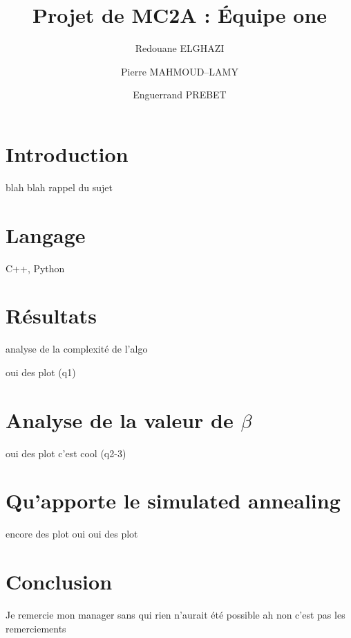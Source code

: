 \documentclass[twocolumn]{report}
\date{}
\author{Redouane ELGHAZI \and Pierre MAHMOUD--LAMY \and Enguerrand PREBET}
\title{Projet de MC2A : Équipe one}
\begin{document}
	\maketitle
	\section{Introduction}
		blah blah rappel du sujet
	\section{Langage}
		C++, Python
	\section{Résultats}
		analyse de la complexité de l'algo
		
		oui des plot (q1)
	\section{Analyse de la valeur de $\beta$}
		oui des plot c'est cool (q2-3)
	\section{Qu'apporte le simulated annealing}
		encore des plot oui oui des plot
		
	\section{Conclusion}
		Je remercie mon manager sans qui rien n'aurait été possible ah non c'est pas les remerciements
\end{document}
